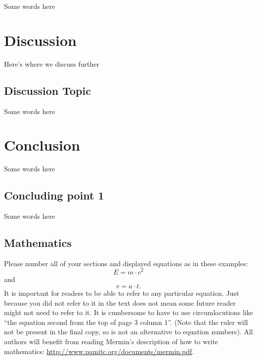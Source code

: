 \documentclass[10pt,twocolumn,letterpaper]{article}
\begin{document}
Some words here

\section{Discussion}
\label{sec:discussion}

Here's where we discuss further

\subsection{Discussion Topic}

Some words here

\section{Conclusion}
\label{sec:conclusion}

Some words here

\subsection{Concluding point 1}

Some words here




\subsection{Mathematics}

Please number all of your sections and displayed equations as in these examples:
\begin{equation}
  E = m\cdot c^2
  \label{eq:important}
\end{equation}
and
\begin{equation}
  v = a\cdot t.
  \label{eq:also-important}
\end{equation}
It is important for readers to be able to refer to any particular equation.
Just because you did not refer to it in the text does not mean some future reader might not need to refer to it.
It is cumbersome to have to use circumlocutions like ``the equation second from the top of page 3 column 1''.
(Note that the ruler will not be present in the final copy, so is not an alternative to equation numbers).
All authors will benefit from reading Mermin's description of how to write mathematics:
\url{http://www.pamitc.org/documents/mermin.pdf}.
\end{document}

